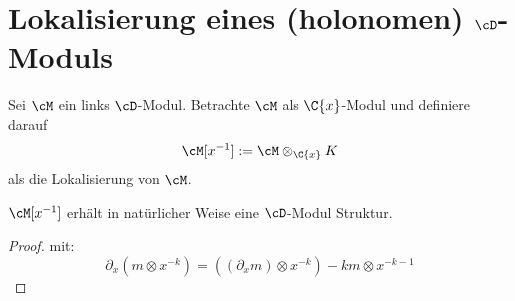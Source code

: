 \begin{comment}
\section{Lokalisierung von $\Ckx$-Moduln}
\cite[Chap 4.1.]{sabbah_cimpa90}
Sei $M$ ein $\Ckx$-Modul. Wir schreiben $M[x^{-1}]$ für den $K$-Vektor Raum
$M\otimes_{\Ckx}K$. Im allgemeinen gilt, falls $M$ von andlichen Typ über
$\Ckx$ ist, so ist $C[x^{-1}]$ von endlichem Typ über $K$. Bemerke aber, dass
$M[x^{-1}]$ generell nicht von endlichem Typ über $\Ckx$ ist.
\end{comment}

\section{Lokalisierung eines (holonomen) $\cD$-Moduls}
\cite[Chap 4.2.]{sabbah_cimpa90}
Sei $\cM$ ein links $\cD$-Modul. Betrachte $\cM$ als $\C\{x\}$-Modul und
definiere darauf
\[ \cM[x^{-1}]:=\cM\otimes_{\C\{x\}}K \]
als die Lokalisierung von $\cM$.
\begin{prop} \cite[Prop 4.2.1.]{sabbah_cimpa90}
$\cM[x^{-1}]$ erhält in natürlicher Weise eine $\cD$-Modul Struktur.
\end{prop}
\begin{proof} \cite[Prop 4.2.1.]{sabbah_cimpa90}
mit:
\[
\partial_x(m\otimes x^{-k})=((\partial_xm)\otimes x^{-k})-km\otimes x^{-k-1}
\]
\begin{comment}
beweis der $\cD$-linearität ist als übung gelassen
\end{comment}
\end{proof}


